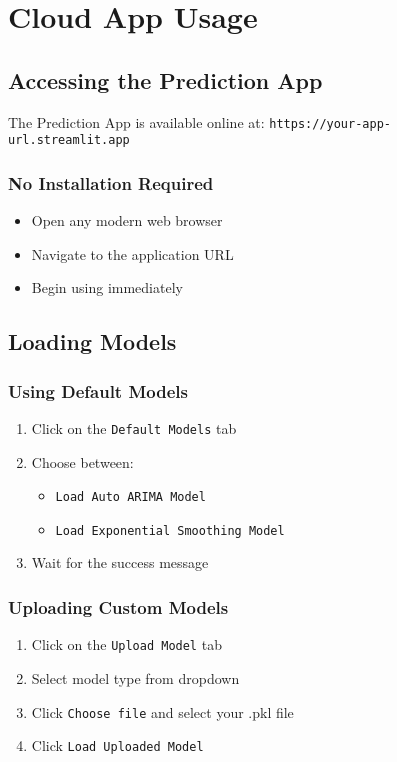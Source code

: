 \chapter{Cloud App Usage}

\section{Accessing the Prediction App}

The Prediction App is available online at: \verb|https://your-app-url.streamlit.app|

\subsection{No Installation Required}
\begin{itemize}
	\item Open any modern web browser
	\item Navigate to the application URL
	\item Begin using immediately
\end{itemize}

\section{Loading Models}

\subsection{Using Default Models}
\begin{enumerate}
	\item Click on the \texttt{Default Models} tab
	\item Choose between:
	\begin{itemize}
		\item \texttt{Load Auto ARIMA Model}
		\item \texttt{Load Exponential Smoothing Model}
	\end{itemize}
	\item Wait for the success message
\end{enumerate}

\subsection{Uploading Custom Models}
\begin{enumerate}
	\item Click on the \texttt{Upload Model} tab
	\item Select model type from dropdown
	\item Click \texttt{Choose file} and select your .pkl file
	\item Click \texttt{Load Uploaded Model}
\end{enumerate}

